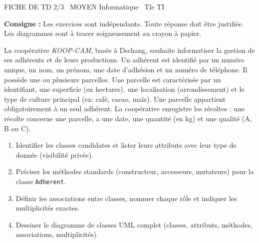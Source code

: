 \documentclass[11pt]{article}
\begin{document}
\begin{tcolorbox}[enhanced,colback=popink,colframe=popink,arc=10pt,boxrule=0pt,left=12pt,right=12pt,top=9pt,bottom=9pt]
{\color{white}\popxbold\small FICHE DE TD 2/3 \textbullet\ MOYEN \hfill Informatique \textbullet\ Tle TI\par}
\end{tcolorbox}
\vspace{4pt}
\noindent \textbf{Consigne :} Les exercices sont indépendants. Toute réponse doit être justifiée. Les diagrammes sont à tracer soigneusement au crayon à papier.

\begin{exercice}
La coopérative \textit{KOOP-CAM}, basée à Dschang, souhaite informatiser la gestion de ses adhérents et de leurs productions. Un adhérent est identifié par un numéro unique, un nom, un prénom, une date d'adhésion et un numéro de téléphone. Il possède une ou plusieurs parcelles. Une parcelle est caractérisée par un identifiant, une superficie (en hectares), une localisation (arrondissement) et le type de culture principal (ex: café, cacao, maïs). Une parcelle appartient obligatoirement à un seul adhérent. La coopérative enregistre les récoltes : une récolte concerne une parcelle, a une date, une quantité (en kg) et une qualité (A, B ou C).
\begin{enumerate}
    \item Identifier les classes candidates et lister leurs attributs avec leur type de donnée (visibilité privée).
    \item Préciser les méthodes standards (constructeur, accesseurs, mutateurs) pour la classe \texttt{Adherent}.
    \item Définir les associations entre classes, nommer chaque rôle et indiquer les multiplicités exactes.
    \item Dessiner le diagramme de classes UML complet (classes, attributs, méthodes, associations, multiplicités).
\end{enumerate}
\end{exercice}
\end{document}
